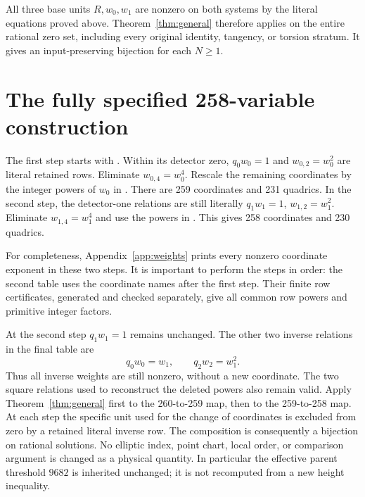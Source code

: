 \documentclass[11pt,a4paper]{article}
\begin{document}
All three base units $R,w_0,w_1$ are nonzero on both systems by the
literal equations proved above. Theorem~\ref{thm:general} therefore
applies on the entire rational zero set, including every original
identity, tangency, or torsion stratum. It gives an input-preserving
bijection for each $N\ge1$.

\section{The fully specified 258-variable construction}
The first step starts with .
Within its detector zero, $q_0w_0=1$ and $w_{0,2}=w_0^2$ are literal
retained rows. Eliminate $w_{0,4}=w_0^4$. Rescale the remaining coordinates
by the integer powers of $w_0$ in . There are 259
coordinates and 231 quadrics. In the second step, the detector-one
relations are still literally $q_1w_1=1$, $w_{1,2}=w_1^2$.
Eliminate $w_{1,4}=w_1^4$ and use the powers in .
This gives 258 coordinates and 230 quadrics.

For completeness, Appendix~\ref{app:weights} prints every nonzero
coordinate exponent in these two steps. It is important to perform the
steps in order: the second table uses the coordinate names after the
first step. Their finite row certificates, generated and checked
separately, give all common row powers and primitive integer factors.

At the second step $q_1w_1=1$ remains unchanged. The other two inverse
relations in the final table are
\[
 q_0w_0=w_1,\qquad q_2w_2=w_1^2.
\]
Thus all inverse weights are still nonzero, without a new coordinate.
The two square relations used to reconstruct the deleted powers also
remain valid. Apply Theorem~\ref{thm:general} first to the 260-to-259 map,
then to the 259-to-258 map. At each step the specific unit used for the
change of coordinates is excluded from zero by a retained literal inverse
row. The composition is consequently a bijection on rational solutions.
No elliptic index, point chart, local order, or comparison argument is
changed as a physical quantity. In particular the effective parent
threshold $9682$ is inherited unchanged; it is not recomputed from a
new height inequality.
\end{document}
